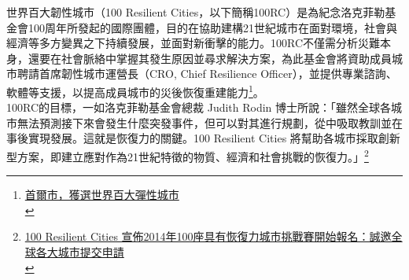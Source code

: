\documentclass[a4paper,12pt]{article}
\begin{document}
世界百大韌性城市（100 Resilient Cities，以下簡稱100RC）是為紀念洛克菲勒基金會100周年所發起的國際團體，目的在協助建構21世紀城市在面對環境，社會與經濟等多方變異之下持續發展，並面對新衝擊的能力。100RC不僅需分析災難本身，還要在社會脈絡中掌握其發生原因並尋求解決方案，為此基金會將資助成員城市聘請首席韌性城市運營長（CRO, Chief Resilience Officer），並提供專業諮詢、軟體等支援，以提高成員城市的災後恢復重建能力\footnote{\href{http://tchinese.seoul.go.kr/\%E9\%A6\%96\%E7\%88\%BE\%E5\%B8\%82\%EF\%BC\%8C\%E7\%8D\%B2\%E9\%81\%B8\%E4\%B8\%96\%E7\%95\%8C\%E7\%99\%BE\%E5\%A4\%A7\%E5\%BD\%88\%E6\%80\%A7\%E5\%9F\%8E\%E5\%B8\%82/?print=print}{首爾市，獲選世界百大彈性城市}\\}。\\

100RC的目標，一如洛克菲勒基金會總裁 Judith Rodin 博士所說：「雖然全球各城市無法預測接下來會發生什麼突發事件，但可以對其進行規劃，從中吸取教訓並在事後實現發展。這就是恢復力的關鍵。100 Resilient Cities 將幫助各城市採取創新型方案，即建立應對作為21世紀特徵的物質、經濟和社會挑戰的恢復力。」\footnote{\href{https://hk.prnasia.com/story/101563-2.shtml}{100 Resilient Cities 宣佈2014年100座具有恢復力城市挑戰賽開始報名：誠邀全球各大城市提交申請}\\}\\
\end{document}
